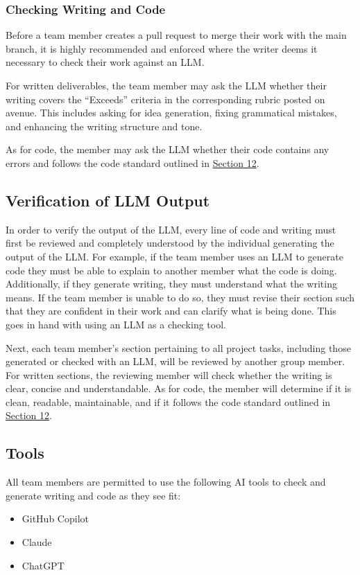 \documentclass{article}
\begin{document}
\subsubsection{Checking Writing and Code}
Before a team member creates a pull request to merge their work with the main branch, it is highly recommended and enforced where the writer deems it necessary to check their work against an LLM. 

For written deliverables, the team member may ask the LLM whether their writing covers the “Exceeds” criteria in the corresponding rubric posted on avenue. 
This includes asking for idea generation, fixing grammatical mistakes, and enhancing the writing structure and tone. 

As for code, the member may ask the LLM whether their code contains any errors and follows the code standard outlined in \hyperref[sec:Code_Standard]{Section 12}.

\subsection{Verification of LLM Output} \label{sec:Verf_LLM_Output}
In order to verify the output of the LLM, every line of code and writing must first be reviewed and completely understood by the individual generating the output of the LLM. 
For example, if the team member uses an LLM to generate code they must be able to explain to another member what the code is doing. 
Additionally, if they generate writing, they must understand what the writing means. 
If the team member is unable to do so, they must revise their section such that they are confident in their work and can clarify what is being done. 
This goes in hand with using an LLM as a checking tool.

Next, each team member’s section pertaining to all project tasks, including those generated or checked with an LLM, will be reviewed by another group member.
For written sections, the reviewing member will check whether the writing is clear, concise and understandable. 
As for code, the member will determine if it is clean, readable, maintainable, and if it follows the code standard outlined in \hyperref[sec:Code_Standard]{Section 12}. 

\subsection{Tools} \label{sec:Tools}
All team members are permitted to use the following AI tools to check and generate writing and code as they see fit:
\begin{itemize}
    \item GitHub Copilot
    \item Claude
    \item ChatGPT
\end{itemize}
\end{document}
